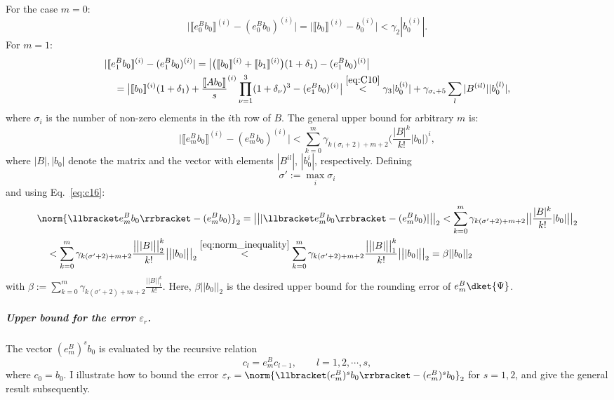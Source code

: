 For the case $m=0$:
\begin{equation}
    \big|\llbracket e^B_0b_0 \rrbracket^{(i)} -(e^B_0b_0)^{(i)} \big|
    =\big|\llbracket b_0\rrbracket ^{(i)} -b_0 ^{(i)}\big|<\gamma_2|b_0^{(i)}|.
\end{equation}
For $m=1$:
\begin{align}
\label{eq:c17}
    &|\llbracket e^B_1b_0 \rrbracket^{(i)}-(e^B_1b_0 )^{(i)}|
    =\big|\big(\llbracket b_0\rrbracket ^{(i)}+\llbracket 
    b_1\rrbracket^{(i)}\big)(1+\delta_1)-(e^B_1b_0 )^{(i)}\big| \\
\nonumber    &\quad=\big|\llbracket b_0\rrbracket ^{(i)}(1+\delta_1)+\frac{\llbracket Ab_0\rrbracket}{s}^{(i)}\prod_{\nu=1}^3(1+\delta_\nu)^3-(e^B_1b_0 )^{(i)}\big| \overset{\eqref{eq:C10}}{<}\gamma_3|b_0^{(i)}| + \gamma_{\sigma_i+5}\sum_l|B^{(il)}||b_0^{(l)}|,
\end{align}
where $\sigma_i$ is the number of non-zero elements in the $i$th row of $B$.
The general upper bound for arbitrary $m$ is:
\begin{equation}
\label{eq:c16}
    \big|\llbracket e^B_mb_0 \rrbracket^{(i)} -(e^B_mb_0 )^{(i)}\big|<\sum_{k=0}^m\gamma_{k(\sigma_i+2)+m+2}\big(\frac{|B|^k}{k!}|b_0|\big)^i,
\end{equation}
where $|B|,|b_0|$ denote the matrix and the vector with elements $|B^{il}|$, $|b_0^{i}|$, respectively. Defining
\begin{equation}
\label{eq:sigmapdef}
    \sigma':=\max_i \sigma_i
\end{equation} 
and using Eq.~\eqref{eq:c16}:
\begin{align}
\nonumber    & \norm{\llbracket e^B_mb_0 \rrbracket -(e^B_mb_0 )}_2=\big|\big||\llbracket e^B_mb_0 \rrbracket -(e^B_mb_0 )|\big|\big|_2<\sum_{k=0}^m\gamma_{k(\sigma'+2)+m+2}\big|\big|\frac{|B|^k}{k!}|b_0|\big|\big|_2\\
\label{eq:B23} &\quad <\sum_{k=0}^m\gamma_{k(\sigma'+2)+m+2}\frac{\big|\big||B|\big|\big|_2^k}{k!}\big|\big||b_0|\big|\big|_2
 \overset{\eqref{eq:norm_inequality}}{<}\sum_{k=0}^m\gamma_{k(\sigma'+2)+m+2}\frac{\big|\big||B|\big|\big|_1^k}{k!}\big|\big||b_0|\big|\big|_2=\beta||b_0||_2
\end{align}
with $\beta:=\sum_{k=0}^m\gamma_{k(\sigma'+2)+m+2}\frac{||B||_1^k}{k!}$. Here, $\beta||b_0||_2$ is the desired upper bound for the rounding error of $e^B_m\dket{\Psi}$. 

\subparagraph{Upper bound for the error $\varepsilon_r$.}
\label{par:upper_bound_eps_r}
The vector $(e^B_m)^sb_0 $ is evaluated by the recursive relation
\begin{equation}
\label{eq:recursive_relation2}
    c_l=e^B_m c_{l-1},\qquad l=1,2,\cdots,s,
\end{equation}
where $c_0=b_0$. 
I illustrate how to bound the error $\varepsilon_r=\norm{\llbracket (e^B_m)^sb_0\rrbracket-(e^B_m)^sb_0 }_2$ for $s=1,2$, and give the general result subsequently. 

